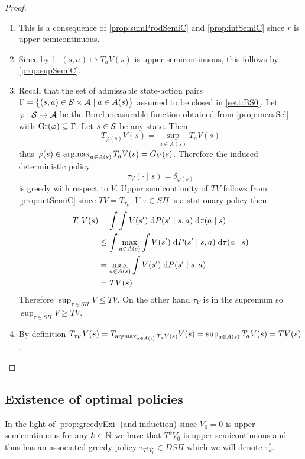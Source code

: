 \begin{proof}
  \leavevmode
  \begin{enumerate}
    \item This is a consequence of \cref{prop:sumProdSemiC}
      and \cref{prop:intSemiC} since $r$ is upper semicontinuous.
    \item Since by 1. $(s, a) \mapsto T_a V(s)$ is upper semicontinuous, this
      follows by \cref{prop:supSemiC}.
    \item Recall that the set of admissable state-action pairs
      $\Gamma = \left\{ (s, a) \in \mathcal{S} \times \mathcal{A} 
      \mid a \in A(s) \right\}$ assumed to be closed in
      \cref{sett:BS0}.
      Let $\varphi : \mathcal{S} \to \mathcal{A}$ be the Borel-measurable function
      obtained from \cref{prop:measSel}
      with $\mathrm{Gr}(\varphi) \subseteq \Gamma$.
      Let $s \in \mathcal{S}$ be any state. Then
      \[ T_{\varphi(s)} V(s) = \sup_{a \in A(s)} T_a V(s) \]
      thus $\varphi(s) \in \operatorname*{argmax}_{a \in A(s)} T_a V(s) = G_V(s)$.
      Therefore the induced deterministic policy
      \[ \tau_V(\cdot \mid s) = \delta_{\varphi(s)} \]
      is greedy with respect to $V$. Upper semicontinuity of $TV$ follows
      from \cref{prop:intSemiC} since $TV = T_{\tau_V}$.
      If $\tau \in S\Pi$ is a stationary policy then
      \begin{align*}
	T_\tau V(s) &=
	\int \int V(s') \; \mathrm{d} P(s' \mid s, a) \; \mathrm{d} \tau(a \mid s)
	\\ & \leq \int \max_{a \in A(s)} \int V(s') \; \mathrm{d} P(s' \mid s, a)
	\; \mathrm{d} \tau(a \mid s)
	\\ & = \max_{a \in A(s)} \int V(s') \; \mathrm{d} P(s' \mid s, a)
	\\ & = TV(s)
      \end{align*}
      Therefore $\sup_{\tau \in S\Pi} V \leq TV$. On the other hand
      $\tau_V$ is in the supremum so
      $\sup_{\tau \in S\Pi} V \geq TV$.
    \item By definition $T_{\tau_V} V(s) = T_{\operatorname*{argmax}_{a \in A(s)} T_a V(s)}
      V(s) = \sup_{a \in A(s)} T_a V(s) = TV(s)$.
  \end{enumerate}
\end{proof}

\subsection{Existence of optimal policies}

In the light of \cref{prop:greedyExi} (and induction)
since $V_0 = 0$ is upper semicontinuous for any $k \in \mathbb{N}$ we have that
$T^k V_0$ is upper semicontinuous and thus has an associated greedy
policy $\tau_{T^k V_0} \in DS\Pi$ which we will denote $\tau^*_k$.

